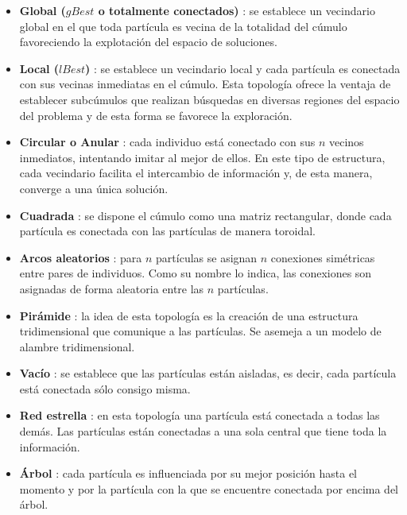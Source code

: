   \begin{itemize}
   \item \textbf{Global ($gBest$ o totalmente conectados)} \cite{JKRBParticle}: se establece un vecindario global en el que toda part\'icula 
   es vecina de la totalidad del c\'umulo favoreciendo la explotaci\'on del espacio de soluciones.
   \item \textbf{Local ($lBest$)} \cite{JKRBParticle}: se establece un vecindario local y cada part\'icula es conectada con sus vecinas inmediatas 
   en el c\'umulo. Esta topolog\'ia ofrece la ventaja de establecer subc\'umulos que realizan b\'usquedas en diversas regiones del espacio 
   del problema y de esta forma se favorece la exploraci\'on.
   \item \textbf{Circular o Anular} \cite{JKennedySI}: cada individuo est\'a conectado con sus $n$ vecinos inmediatos, intentando imitar al mejor de ellos. En este 
   tipo de estructura, cada vecindario facilita el intercambio de informaci\'on y, de esta manera, converge a una \'unica soluci\'on.
   \item \textbf{Cuadrada} \cite{JKRBPaM}: se dispone el c\'umulo como una matriz rectangular, donde cada part\'icula es conectada 
   con las part\'iculas de manera toroidal.
   \item \textbf{Arcos aleatorios} \cite{cagnia10}: para $n$ part\'iculas se asignan $n$ conexiones sim\'etricas entre pares de individuos. Como su nombre 
   lo indica, las conexiones son asignadas de forma aleatoria entre las $n$ part\'iculas.
   \item \textbf{Pir\'amide} \cite{cagnia10} : la idea de esta topolog\'ia es la creaci\'on de una estructura tridimensional que comunique a las part\'iculas. 
   Se asemeja a un modelo de alambre tridimensional.
   \item \textbf{Vac\'io} \cite{Margarita01}: se establece que las part\'iculas est\'an aisladas, es decir, cada part\'icula est\'a conectada 
    s\'olo consigo misma.
   \item \textbf{Red estrella} \cite{Margarita01}: en esta topolog\'ia una part\'icula est\'a conectada a todas las dem\'as. Las part\'iculas est\'an conectadas 
   a una sola central que tiene toda la informaci\'on. 
   \item \textbf{\'Arbol} \cite{JKennedySI}: cada part\'icula es influenciada por su mejor posici\'on hasta el momento y por la part\'icula con la que 
   se encuentre conectada por encima del \'arbol.
  \end{itemize}

